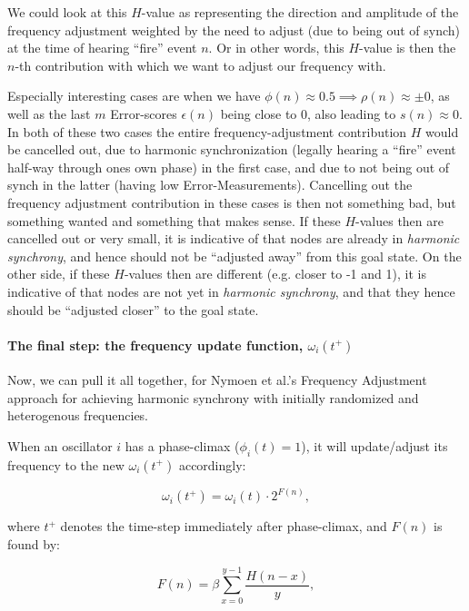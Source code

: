 		We could look at this $H$-value as representing the direction and amplitude of the frequency adjustment weighted by the need to adjust (due to being out of synch) at the time of hearing ``fire'' event $n$. Or in other words, this $H$-value is then the $n$-th contribution with which we want to adjust our frequency with.

		Especially interesting cases are when we have $\phi(n)\approx0.5 \implies \rho(n)\approx\pm0$, as well as the last $m$ Error-scores $\epsilon(n)$ being close to 0, also leading to $s(n)\approx0$. In both of these two cases the entire frequency-adjustment contribution $H$ would be cancelled out, due to harmonic synchronization (legally hearing a ``fire'' event half-way through ones own phase) in the first case, and due to not being out of synch in the latter (having low Error-Measurements). Cancelling out the frequency adjustment contribution in these cases is then not something bad, but something wanted and something that makes sense. If these $H$-values then are cancelled out or very small, it is indicative of that nodes are already in \textit{harmonic synchrony}, and hence should not be ``adjusted away'' from this goal state. On the other side, if these $H$-values then are different (e.g. closer to -1 and 1), it is indicative of that nodes are not yet in \textit{harmonic synchrony}, and that they hence should be ``adjusted closer'' to the goal state.
		

		\paragraph{The final step: the frequency update function, $\omega_i(t^+)$}
		
		Now, we can pull it all together, for Nymoen et al.'s Frequency Adjustment approach for achieving harmonic synchrony with initially randomized and heterogenous frequencies.

		When an oscillator $i$ has a phase-climax ($\phi_i(t)=1$), it will update/adjust its frequency to the new $\omega_i(t^+)$ accordingly:

		\begin{equation}
		\label{freq_adj}
			\omega_i(t^+) = \omega_i(t) \cdot 2^{F(n)},
		\end{equation}

		where $t^+$ denotes the time-step immediately after phase-climax, and $F(n)$ is found by:

		\begin{equation}
		\label{f_value}
			F(n) = \beta\sum_{x=0}^{y-1}\frac{H(n-x)}{y},
		\end{equation}


